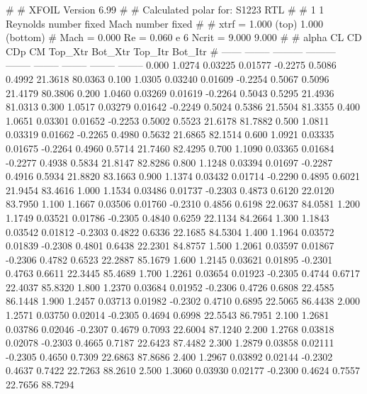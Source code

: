 #  
#       XFOIL         Version 6.99
#  
# Calculated polar for: S1223 RTL                                       
#  
# 1 1 Reynolds number fixed          Mach number fixed         
#  
# xtrf =   1.000 (top)        1.000 (bottom)  
# Mach =   0.000     Re =     0.060 e 6     Ncrit =   9.000  9.000
#  
#   alpha    CL        CD       CDp       CM     Top_Xtr  Bot_Xtr  Top_Itr  Bot_Itr
#  ------ -------- --------- --------- -------- -------- -------- -------- --------
   0.000   1.0274   0.03225   0.01577  -0.2275   0.5086   0.4992  21.3618  80.0363
   0.100   1.0305   0.03240   0.01609  -0.2254   0.5067   0.5096  21.4179  80.3806
   0.200   1.0460   0.03269   0.01619  -0.2264   0.5043   0.5295  21.4936  81.0313
   0.300   1.0517   0.03279   0.01642  -0.2249   0.5024   0.5386  21.5504  81.3355
   0.400   1.0651   0.03301   0.01652  -0.2253   0.5002   0.5523  21.6178  81.7882
   0.500   1.0811   0.03319   0.01662  -0.2265   0.4980   0.5632  21.6865  82.1514
   0.600   1.0921   0.03335   0.01675  -0.2264   0.4960   0.5714  21.7460  82.4295
   0.700   1.1090   0.03365   0.01684  -0.2277   0.4938   0.5834  21.8147  82.8286
   0.800   1.1248   0.03394   0.01697  -0.2287   0.4916   0.5934  21.8820  83.1663
   0.900   1.1374   0.03432   0.01714  -0.2290   0.4895   0.6021  21.9454  83.4616
   1.000   1.1534   0.03486   0.01737  -0.2303   0.4873   0.6120  22.0120  83.7950
   1.100   1.1667   0.03506   0.01760  -0.2310   0.4856   0.6198  22.0637  84.0581
   1.200   1.1749   0.03521   0.01786  -0.2305   0.4840   0.6259  22.1134  84.2664
   1.300   1.1843   0.03542   0.01812  -0.2303   0.4822   0.6336  22.1685  84.5304
   1.400   1.1964   0.03572   0.01839  -0.2308   0.4801   0.6438  22.2301  84.8757
   1.500   1.2061   0.03597   0.01867  -0.2306   0.4782   0.6523  22.2887  85.1679
   1.600   1.2145   0.03621   0.01895  -0.2301   0.4763   0.6611  22.3445  85.4689
   1.700   1.2261   0.03654   0.01923  -0.2305   0.4744   0.6717  22.4037  85.8320
   1.800   1.2370   0.03684   0.01952  -0.2306   0.4726   0.6808  22.4585  86.1448
   1.900   1.2457   0.03713   0.01982  -0.2302   0.4710   0.6895  22.5065  86.4438
   2.000   1.2571   0.03750   0.02014  -0.2305   0.4694   0.6998  22.5543  86.7951
   2.100   1.2681   0.03786   0.02046  -0.2307   0.4679   0.7093  22.6004  87.1240
   2.200   1.2768   0.03818   0.02078  -0.2303   0.4665   0.7187  22.6423  87.4482
   2.300   1.2879   0.03858   0.02111  -0.2305   0.4650   0.7309  22.6863  87.8686
   2.400   1.2967   0.03892   0.02144  -0.2302   0.4637   0.7422  22.7263  88.2610
   2.500   1.3060   0.03930   0.02177  -0.2300   0.4624   0.7557  22.7656  88.7294
